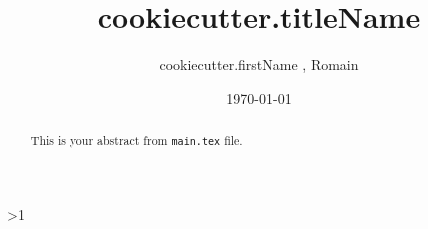 \documentclass[a4paper]{article}  %
\title{ {{cookiecutter.titleName}} }
\author{ {{cookiecutter.firstName}} \famName{ {{cookiecutter.familyName}} }, Romain \famName{Noël} }
\date{\today}
\newcommand{\Pathbasebib}{\PathR/ref_RN.bib,\PathR/ref_XX.bib}%
\begin{document}

\maketitle

	\begin{abstract}
		This is your abstract from \texttt{main.tex} file.
	\end{abstract}


%
%




\ifnum\value{levelstanda}>1
	{}%
\else

	\printunsrtglossary[type=acronym]
	\printunsrtglossary[type=symbol]
\fi

\addtocounter{levelstanda}{-1}
\end{document}
